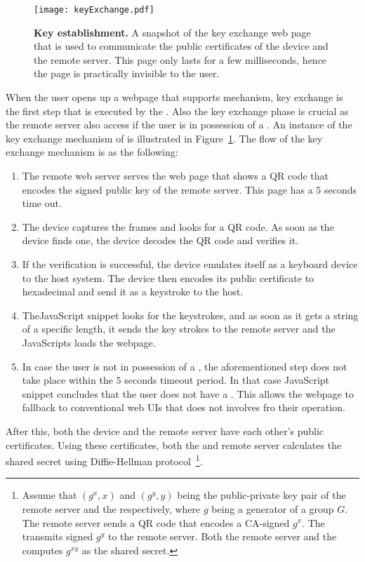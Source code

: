 \begin{figure}[t]
\centering
\texttt{[image: keyExchange.pdf]}
\caption{\textbf{Key establishment.} A snapshot of the key exchange web page that is used to communicate the public certificates of the device and the remote server. This page only lasts for a few milliseconds, hence the page is practically invisible to the user.}
\label{fig:keyExchange}
\centering
\end{figure}

When the user opens up a webpage that supports \name mechanism, key exchange is the first step that is executed by the \device. Also the key exchange phase is crucial as the remote server also access if the user is in possession of a \device. An instance of the key exchange mechanism of \name is illustrated in Figure~\ref{fig:keyExchange}. The flow of the key exchange mechanism is as the following:

\begin{enumerate}
  \item The remote web server serves the web page that shows a QR code that encodes the signed public key of the remote server. This page has a $5$ seconds time out.
  \item The device captures the frames and looks for a QR code. As soon as the device finds one, the device decodes the QR code and verifies it.
  \item If the verification is successful, the device emulates itself as a keyboard device to the host system. The device then encodes its public certificate to hexadecimal and send it as a keystroke to the host.
  \item The\name  JavaScript snippet looks for the keystrokes, and as soon as it gets a string of a specific length, it sends the key strokes to the remote server and the \name JavaScripts loads the webpage.
  \item In case the user is not in possession of a \device, the aforementioned step does not take place within the $5$ seconds timeout period. In that case \name JavaScript snippet concludes that the user does not have a \device. This allows the webpage to fallback to conventional web UIs that does not involves \device fro their operation.
\end{enumerate}

After this, both the device and the remote server have each other's public certificates. Using these certificates, both the \device and remote server calculates the shared secret using Diffie-Hellman protocol~\footnote{Assume that $(g^x, x)$ and $(g^y, y)$ being the public-private key pair of the remote server and the \device respectively, where $g$ being a generator of a group $G$. The remote server sends a QR code that encodes a CA-signed $g^x$. The \device transmits signed $g^y$ to the remote server. Both the remote server and the \device computes $g^{xy}$ as the shared secret.}.



